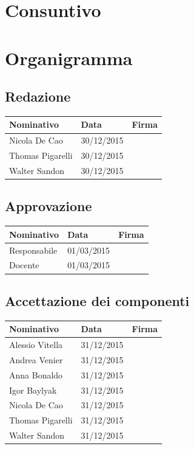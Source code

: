 \documentclass[12pt,a4paper]{article}
\begin{document}
\newpage
\section{Consuntivo}

\newpage
\appendix
\section{Organigramma}

\subsection{Redazione}

\begin{tabular}{| l | l | l |}
    \hline
    Nominativo & Data & Firma \\ \hline
    Nicola De Cao & 30/12/2015 & \\ \hline
    Thomas Pigarelli & 30/12/2015 & \\ \hline
    Walter Sandon & 30/12/2015 & \\ \hline
\end{tabular}


\subsection{Approvazione}

\begin{tabular}{| l | l | l |}
    \hline
    Nominativo & Data & Firma \\ \hline
    Responsabile & 01/03/2015 & \\ \hline
    Docente & 01/03/2015 & \\ \hline
\end{tabular}

\subsection{Accettazione dei componenti}

\begin{tabular}{| l | l | l |}
    \hline
    Nominativo & Data & Firma \\ \hline
    Alessio Vitella & 31/12/2015 & \\ \hline
    Andrea Venier & 31/12/2015 & \\ \hline
    Anna Bonaldo & 31/12/2015 & \\ \hline
    Igor Baylyak & 31/12/2015 & \\ \hline
    Nicola De Cao & 31/12/2015 & \\ \hline
    Thomas Pigarelli & 31/12/2015 & \\ \hline
    Walter Sandon & 31/12/2015 & \\ \hline
\end{tabular}
\end{document}
